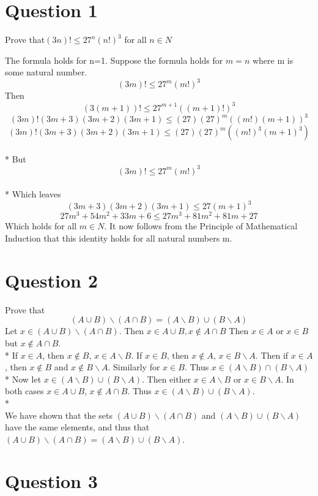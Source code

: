 \documentclass[a4paper,12pt]{article}
\begin{document}
\section{Question 1}

Prove that$(3n)! \leq {27}^n(n!)^3$ for all $n \in N$

The formula holds for n=1.
Suppose the formula holds for $m=n$ where m is some natural number.
\[ (3m)! \leq {27}^m(m!)^3 \]
Then \[(3(m + 1))! \leq {27}^{m + 1}((m + 1)!)^3\]
\[(3m)!(3m + 3)(3m + 2)(3m + 1) \leq (27)(27)^m{((m!)(m + 1))}^3\]
\[(3m)!(3m + 3)(3m + 2)(3m + 1) \leq (27)(27)^m({(m!)}^3{(m + 1)}^3)\]
\\*
But \[(3m)! \leq 27^m(m!)^3\]
\\*
Which leaves \[(3m + 3)(3m + 2)(3m + 1) \leq 27{(m + 1)}^3\]
\[27{m}^3 + 54{m}^2 + 33m + 6 \leq 27{m}^3 + 81{m}^2 + 81m + 27\]
Which holds for all $m \in N$.
It now follows from the Principle of Mathematical Induction that this identity holds for all natural numbers m.

\section{Question 2}
Prove that \[(A \cup B) \backslash (A \cap B) = (A \backslash B) \cup (B \backslash A)\]
Let $x \in (A \cup B)\backslash(A \cap B)$. Then $x \in A \cup B, x \notin A \cap B$
Then $x \in A$ or $x \in B$ but $x \notin A \cap B$.
\\*
If $x \in A$, then $x \notin B$, $x \in A \backslash B$. If $x \in B$, then $x \notin A$, $x \in B \backslash A$.
Then if $x \in A$, then $x \notin B$ and $x \notin B \backslash A$. Similarly for $x \in B$.
Thus $x \in (A \backslash B) \cap (B \backslash A)$
\\*
Now let $x \in (A \backslash B) \cup (B \backslash A)$. Then either $x \in A \backslash B$ or $x \in B \backslash A$. 
In both cases $x \in A \cup B$, $x \notin A \cap B$. Thus $x \in (A \backslash B) \cup (B \backslash A)$.
\\*
\\
We have shown that the sets $(A \cup B) \backslash (A \cap B)$ and $(A \backslash B) \cup (B \backslash A)$
have the same elements, and thus that $(A \cup B) \backslash (A \cap B) = (A \backslash B) \cup (B \backslash A)$.

\section{Question 3}
\end{document}
